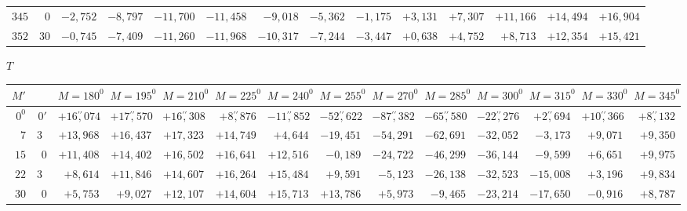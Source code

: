 \begin{landscape}
\begin{longtable}{@{}rr|r|r|r|r|r|r|r|r|r|r|r|r@{}}
\(345\) & \(0\) & \(-2{,}752\) & \(-8{,}797\) & \(-11{,}700\) & \(-11{,}458\) & \(-9{,}018\) & \(-5{,}362\) & \(-1{,}175\) & \(+3{,}131\) & \(+7{,}307\) & \(+11{,}166\) & \(+14{,}494\) & \(+16{,}904\)\\
\(352\) & \(30\) & \(-0{,}745\) & \(-7{,}409\) & \(-11{,}260\) & \(-11{,}968\) & \(-10{,}317\) & \(-7{,}244\) & \(-3{,}447\) & \(+0{,}638\) & \(+4{,}752\) & \(+8{,}713\) & \(+12{,}354\) & \(+15{,}421\)\\
\end{longtable}
\clearpage
\endgroup
\clearpage
\begingroup
\fontsize{8.5}{10.5}\selectfont
{}
\renewcommand{\headrulewidth}{0pt}
\begin{center}\(T\)\end{center}
\setlength{\tabcolsep}{2.5pt}
\renewcommand{\arraystretch}{1.08}
\begin{longtable}{@{}rr|r|r|r|r|r|r|r|r|r|r|r|r@{}}
\hline
\(M'\) & & \(M=180^0\) & \(M=195^0\) & \(M=210^0\) & \(M=225^0\) & \(M=240^0\) & \(M=255^0\) & \(M=270^0\) & \(M=285^0\) & \(M=300^0\) & \(M=315^0\) & \(M=330^0\) & \(M=345^0\)\\
\hline
\endhead
\(0^0\) & \(0'\) & \(+16\overset{\prime\prime}{,}074\) & \(+17\overset{\prime\prime}{,}570\) & \(+16\overset{\prime\prime}{,}308\) & \(+8\overset{\prime\prime}{,}876\) & \(-11\overset{\prime\prime}{,}852\) & \(-52\overset{\prime\prime}{,}622\) & \(-87\overset{\prime\prime}{,}382\) & \(-65\overset{\prime\prime}{,}580\) & \(-22\overset{\prime\prime}{,}276\) & \(+2\overset{\prime\prime}{,}694\) & \(+10\overset{\prime\prime}{,}366\) & \(+8\overset{\prime\prime}{,}132\)\\
\(7\) & \(30\) & \(+13{,}968\) & \(+16{,}437\) & \(+17{,}323\) & \(+14{,}749\) & \(+4{,}644\) & \(-19{,}451\) & \(-54{,}291\) & \(-62{,}691\) & \(-32{,}052\) & \(-3{,}173\) & \(+9{,}071\) & \(+9{,}350\)\\
\(15\) & \(0\) & \(+11{,}408\) & \(+14{,}402\) & \(+16{,}502\) & \(+16{,}641\) & \(+12{,}516\) & \(-0{,}189\) & \(-24{,}722\) & \(-46{,}299\) & \(-36{,}144\) & \(-9{,}599\) & \(+6{,}651\) & \(+9{,}975\)\\
\(22\) & \(30\) & \(+8{,}614\) & \(+11{,}846\) & \(+14{,}607\) & \(+16{,}264\) & \(+15{,}484\) & \(+9{,}591\) & \(-5{,}123\) & \(-26{,}138\) & \(-32{,}523\) & \(-15{,}008\) & \(+3{,}196\) & \(+9{,}834\)\\[2pt]
\(30\) & \(0\) & \(+5{,}753\) & \(+9{,}027\) & \(+12{,}107\) & \(+14{,}604\) & \(+15{,}713\) & \(+13{,}786\) & \(+5{,}973\) & \(-9{,}465\) & \(-23{,}214\) & \(-17{,}650\) & \(-0{,}916\) & \(+8{,}787\)\\

\end{longtable}
\end{landscape}
